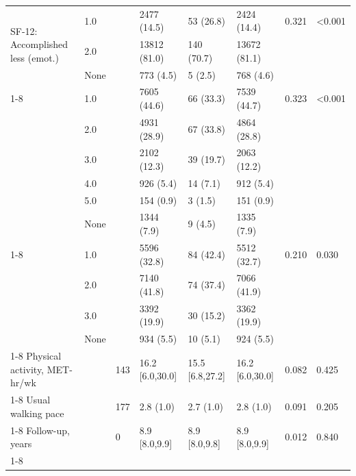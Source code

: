 \begin{tabular}{llllllll}
\multirow[t]{3}{*}{SF-12: Accomplished less (emot.)} & 1.0 &  & 2477 (14.5) & 53 (26.8) & 2424 (14.4) & 0.321 & <0.001 \\
 & 2.0 &  & 13812 (81.0) & 140 (70.7) & 13672 (81.1) &  &  \\
 & None &  & 773 (4.5) & 5 (2.5) & 768 (4.6) &  &  \\
\cline{1-8}
\multirow[t]{6}{*}{SF-12: Pain interference} & 1.0 &  & 7605 (44.6) & 66 (33.3) & 7539 (44.7) & 0.323 & <0.001 \\
 & 2.0 &  & 4931 (28.9) & 67 (33.8) & 4864 (28.8) &  &  \\
 & 3.0 &  & 2102 (12.3) & 39 (19.7) & 2063 (12.2) &  &  \\
 & 4.0 &  & 926 (5.4) & 14 (7.1) & 912 (5.4) &  &  \\
 & 5.0 &  & 154 (0.9) & 3 (1.5) & 151 (0.9) &  &  \\
 & None &  & 1344 (7.9) & 9 (4.5) & 1335 (7.9) &  &  \\
\cline{1-8}
\multirow[t]{4}{*}{SF-12: Vigorous activities} & 1.0 &  & 5596 (32.8) & 84 (42.4) & 5512 (32.7) & 0.210 & 0.030 \\
 & 2.0 &  & 7140 (41.8) & 74 (37.4) & 7066 (41.9) &  &  \\
 & 3.0 &  & 3392 (19.9) & 30 (15.2) & 3362 (19.9) &  &  \\
 & None &  & 934 (5.5) & 10 (5.1) & 924 (5.5) &  &  \\
\cline{1-8}
Physical activity, MET-hr/wk &  & 143 & 16.2 [6.0,30.0] & 15.5 [6.8,27.2] & 16.2 [6.0,30.0] & 0.082 & 0.425 \\
\cline{1-8}
Usual walking pace &  & 177 & 2.8 (1.0) & 2.7 (1.0) & 2.8 (1.0) & 0.091 & 0.205 \\
\cline{1-8}
Follow-up, years &  & 0 & 8.9 [8.0,9.9] & 8.9 [8.0,9.8] & 8.9 [8.0,9.9] & 0.012 & 0.840 \\
\cline{1-8}
\bottomrule
\end{tabular}
